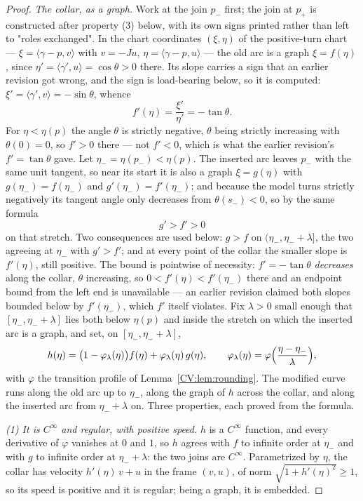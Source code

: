 \begin{proof}
\emph{The collar, as a graph.} Work at the join $p_-$ first; the join at
$p_+$ is constructed after property (3) below, with its own signs printed
rather than left to "roles exchanged". In the chart coordinates
$(\xi,\eta)$ of the positive-turn chart --- $\xi=\langle\gamma-p,v\rangle$ with
$v=-Ju$, $\eta=\langle\gamma-p,u\rangle$ --- the old arc is a graph
$\xi=f(\eta)$, since $\eta'=\langle\gamma',u\rangle=\cos\theta>0$ there. Its
slope carries a sign that an earlier revision got wrong, and the sign is
load-bearing below, so it is computed:
$\xi'=\langle\gamma',v\rangle=-\sin\theta$, whence
\[
   f'(\eta)=\frac{\xi'}{\eta'}=-\tan\theta .
\]
For $\eta<\eta(p)$ the angle $\theta$ is strictly negative, $\theta$ being
strictly increasing with $\theta(0)=0$, so $f'>0$ there --- not $f'<0$, which is
what the earlier revision's $f'=\tan\theta$ gave. Let
$\eta_-=\eta(p_-)<\eta(p)$. The inserted arc leaves $p_-$ with the same unit
tangent, so near its start it is also a graph $\xi=g(\eta)$ with
$g(\eta_-)=f(\eta_-)$ and $g'(\eta_-)=f'(\eta_-)$; and because the model turns
strictly negatively its tangent angle only decreases from $\theta(s_-)<0$, so by
the same formula
\[
   g'>f'>0
\]
on that stretch. Two consequences are used below: $g>f$ on
$(\eta_-,\eta_-+\lambda]$, the two agreeing at $\eta_-$ with $g'>f'$; and at
every point of the collar the smaller slope is $f'(\eta)$, still positive. The
bound is pointwise of necessity: $f'=-\tan\theta$ \emph{decreases} along the
collar, $\theta$ increasing, so $0<f'(\eta)<f'(\eta_-)$ there and an endpoint
bound from the left end is unavailable --- an earlier revision claimed both
slopes bounded below by $f'(\eta_-)$, which $f'$ itself violates. Fix
$\lambda>0$ small enough that $[\eta_-,\eta_-+\lambda]$ lies both below
$\eta(p)$ and inside the stretch on which the inserted arc is a graph, and set,
on $[\eta_-,\eta_-+\lambda]$,
\[
   h(\eta)=\bigl(1-\varphi_\lambda(\eta)\bigr)f(\eta)+\varphi_\lambda(\eta)\,
   g(\eta),
   \qquad
   \varphi_\lambda(\eta)=\varphi\Bigl(\frac{\eta-\eta_-}{\lambda}\Bigr),
\]
with $\varphi$ the transition profile of Lemma~\ref{CV:lem:rounding}. The modified
curve runs along the old arc up to $\eta_-$, along the graph of $h$ across the
collar, and along the inserted arc from $\eta_-+\lambda$ on. Three properties,
each proved from the formula.

\emph{(1) It is $C^\infty$ and regular, with positive speed.} $h$ is a $C^\infty$
function, and every derivative of $\varphi$ vanishes at $0$ and $1$, so $h$
agrees with $f$ to infinite order at $\eta_-$ and with $g$ to infinite order at
$\eta_-+\lambda$: the two joins are $C^\infty$. Parametrized by $\eta$, the
collar has velocity $h'(\eta)\,v+u$ in the frame $(v,u)$, of norm
$\sqrt{1+h'(\eta)^2}\geq1$, so its speed is positive and it is regular; being a
graph, it is embedded.


\end{proof}
